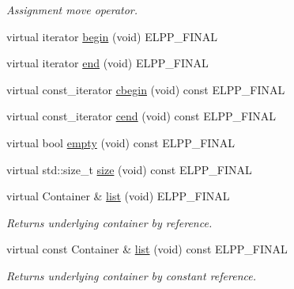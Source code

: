 \begin{DoxyCompactItemize}
\begin{DoxyCompactList}\small\item\em Assignment move operator. \end{DoxyCompactList}\item 
virtual iterator \hyperlink{classel_1_1base_1_1utils_1_1_abstract_registry_a4ad971b1dddff996d327452d852e55b2}{begin} (void) E\+L\+P\+P\+\_\+\+F\+I\+N\+AL
\item 
virtual iterator \hyperlink{classel_1_1base_1_1utils_1_1_abstract_registry_a67c40207c171f23ad50a71db819e84f9}{end} (void) E\+L\+P\+P\+\_\+\+F\+I\+N\+AL
\item 
virtual const\+\_\+iterator \hyperlink{classel_1_1base_1_1utils_1_1_abstract_registry_a37f743184e808d7c0028e21e0d0898bb}{cbegin} (void) const E\+L\+P\+P\+\_\+\+F\+I\+N\+AL
\item 
virtual const\+\_\+iterator \hyperlink{classel_1_1base_1_1utils_1_1_abstract_registry_ad3ee081b4b25c5d77f971f949bdb9158}{cend} (void) const E\+L\+P\+P\+\_\+\+F\+I\+N\+AL
\item 
virtual bool \hyperlink{classel_1_1base_1_1utils_1_1_abstract_registry_a43ff6484b778c298416c482c07a4df3f}{empty} (void) const E\+L\+P\+P\+\_\+\+F\+I\+N\+AL
\item 
virtual std\+::size\+\_\+t \hyperlink{classel_1_1base_1_1utils_1_1_abstract_registry_a58a7b8ea964bdf6008701dcfb6609ca5}{size} (void) const E\+L\+P\+P\+\_\+\+F\+I\+N\+AL
\item 
\mbox{\label{classel_1_1base_1_1utils_1_1_abstract_registry_a072859d3728a75f910c2898f62fd12da}} 
virtual Container \& \hyperlink{classel_1_1base_1_1utils_1_1_abstract_registry_a072859d3728a75f910c2898f62fd12da}{list} (void) E\+L\+P\+P\+\_\+\+F\+I\+N\+AL
\begin{DoxyCompactList}\small\item\em Returns underlying container by reference. \end{DoxyCompactList}\item 
\mbox{\label{classel_1_1base_1_1utils_1_1_abstract_registry_a1c3da2af9177cbfae6f10b9e5dbe615c}} 
virtual const Container \& \hyperlink{classel_1_1base_1_1utils_1_1_abstract_registry_a1c3da2af9177cbfae6f10b9e5dbe615c}{list} (void) const E\+L\+P\+P\+\_\+\+F\+I\+N\+AL
\begin{DoxyCompactList}\small\item\em Returns underlying container by constant reference. \end{DoxyCompactList}\item 

\end{DoxyCompactItemize}
